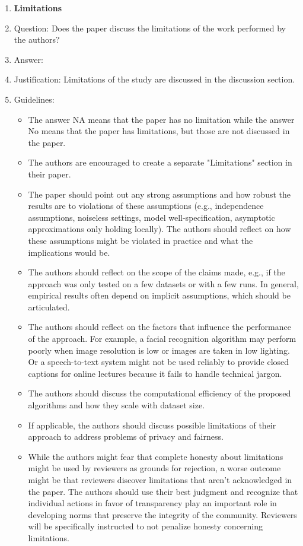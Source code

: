 \documentclass{article}
\begin{document}
\begin{enumerate}
\item {\bf Limitations}
    \item[] Question: Does the paper discuss the limitations of the work performed by the authors?
    \item[] Answer: \answerYes{} %
    \item[] Justification: Limitations of the study are discussed in the discussion section.
    \item[] Guidelines:
    \begin{itemize}
        \item The answer NA means that the paper has no limitation while the answer No means that the paper has limitations, but those are not discussed in the paper. 
        \item The authors are encouraged to create a separate "Limitations" section in their paper.
        \item The paper should point out any strong assumptions and how robust the results are to violations of these assumptions (e.g., independence assumptions, noiseless settings, model well-specification, asymptotic approximations only holding locally). The authors should reflect on how these assumptions might be violated in practice and what the implications would be.
        \item The authors should reflect on the scope of the claims made, e.g., if the approach was only tested on a few datasets or with a few runs. In general, empirical results often depend on implicit assumptions, which should be articulated.
        \item The authors should reflect on the factors that influence the performance of the approach. For example, a facial recognition algorithm may perform poorly when image resolution is low or images are taken in low lighting. Or a speech-to-text system might not be used reliably to provide closed captions for online lectures because it fails to handle technical jargon.
        \item The authors should discuss the computational efficiency of the proposed algorithms and how they scale with dataset size.
        \item If applicable, the authors should discuss possible limitations of their approach to address problems of privacy and fairness.
        \item While the authors might fear that complete honesty about limitations might be used by reviewers as grounds for rejection, a worse outcome might be that reviewers discover limitations that aren't acknowledged in the paper. The authors should use their best judgment and recognize that individual actions in favor of transparency play an important role in developing norms that preserve the integrity of the community. Reviewers will be specifically instructed to not penalize honesty concerning limitations.
    \end{itemize}


\end{enumerate}
\end{document}
